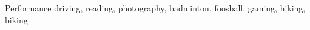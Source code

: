 

\begin{cvparagraph}
{Performance driving, reading, photography, badminton, foosball, gaming, hiking, biking}
\end{cvparagraph}
